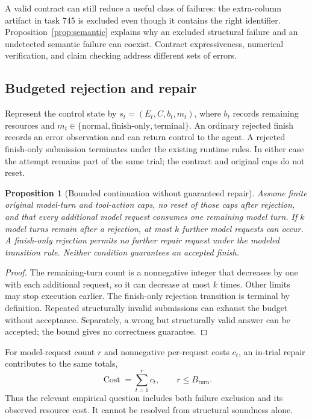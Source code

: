 \documentclass{article}
\newtheorem{proposition}{Proposition}
\begin{document}
A valid contract can still reduce a useful class of failures: the extra-column artifact in task 745 is excluded even though it contains the right identifier. Proposition~\ref{prop:semantic} explains why an excluded structural failure and an undetected semantic failure can coexist. Contract expressiveness, numerical verification, and claim checking address different sets of errors.

\subsection{Budgeted rejection and repair}
Represent the control state by $s_t=(E_t,C,b_t,m_t)$, where $b_t$ records remaining resources and $m_t\in\{\mathrm{normal},\mathrm{finish\mbox{-}only},\mathrm{terminal}\}$. An ordinary rejected finish records an error observation and can return control to the agent. A rejected finish-only submission terminates under the existing runtime rules. In either case the attempt remains part of the same trial; the contract and original caps do not reset.

\begin{proposition}[Bounded continuation without guaranteed repair]
\label{prop:bounded}
Assume finite original model-turn and tool-action caps, no reset of those caps after rejection, and that every additional model request consumes one remaining model turn. If $k$ model turns remain after a rejection, at most $k$ further model requests can occur. A finish-only rejection permits no further repair request under the modeled transition rule. Neither condition guarantees an accepted finish.
\end{proposition}
\begin{proof}
The remaining-turn count is a nonnegative integer that decreases by one with each additional request, so it can decrease at most $k$ times. Other limits may stop execution earlier. The finish-only rejection transition is terminal by definition. Repeated structurally invalid submissions can exhaust the budget without acceptance. Separately, a wrong but structurally valid answer can be accepted; the bound gives no correctness guarantee.
\end{proof}

For model-request count $r$ and nonnegative per-request costs $c_t$, an in-trial repair contributes to the same totals,
\begin{equation}
\operatorname{Cost}=\sum_{t=1}^{r}c_t,\qquad r\le B_{\mathrm{turn}}.
\label{eq:cost}
\end{equation}
Thus the relevant empirical question includes both failure exclusion and its observed resource cost. It cannot be resolved from structural soundness alone.
\end{document}
